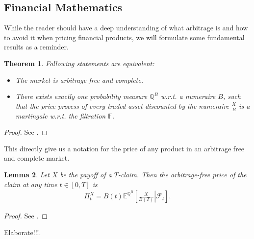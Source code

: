 \documentclass[12pt]{article}
\newtheorem{theorem}{Theorem}[section]
\newtheorem{lemma}[theorem]{Lemma}
\begin{document}
	\subsection{Financial Mathematics}
	While the reader should have a deep understanding of what arbitrage is and how to avoid it when pricing financial products, we will formulate some fundamental results as a reminder.
	\begin{theorem}
		Following statements are equivalent:
		\begin{itemize}
			\item The market is arbitrage free and complete.
			\item There exists exactly one probability measure $\mathbb{Q}^B$ w.r.t. a numeraire $B$, such that the price process of every traded asset discounted by the numeraire $\frac{X}{B}$ is a martingale w.r.t. the filtration $\mathbb{F}$.
		\end{itemize}
	\end{theorem}
	\begin{proof}
		See \cite{fima2Lecture}.
	\end{proof}
	This directly give us a notation for the price of any product in an arbitrage free and complete market.
	\begin{lemma}
		Let $X$ be the payoff of a $T$-claim. Then the arbitrage-free price of the claim at any time $t\in \left[0, T\right]$ is
		\begin{align*}
			\Pi^X_t = B(t)\mathbb{E}^{\mathbb{Q}^B}\left[\left.\frac{X}{B(T)} \right| \mathcal{F}_t\right].
		\end{align*}
	\end{lemma}
	\begin{proof}
		See \cite{fima2Lecture}.
	\end{proof}
	 \color{red}Elaborate!!!\color{black}. 
	
	
\end{document}
